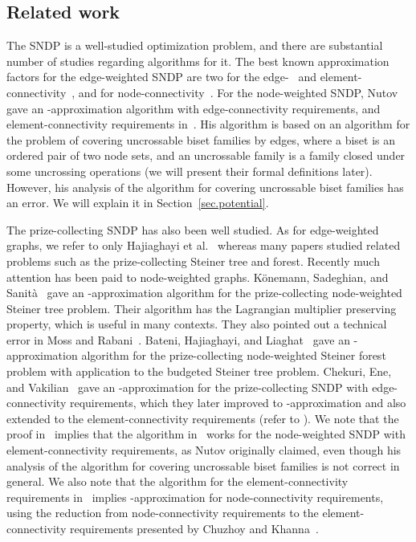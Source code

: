 \documentclass[11pt]{article}
\begin{document}
\subsection{Related work} 

The SNDP is a well-studied optimization
problem, and there are substantial number of studies regarding algorithms for
it. The best known approximation factors for the edge-weighted SNDP are two
for the edge-~\cite{Jain01} and element-connectivity~\cite{FleischerJW06},
and  for node-connectivity~\cite{ChuzhoyK12}. 
For the node-weighted SNDP, 
Nutov~\cite {Nutov10node-weights} gave an -approximation algorithm with edge-connectivity requirements, and
element-connectivity requirements in~\cite{Nutov12uncrossable}. His algorithm
is based on an algorithm for the problem of covering uncrossable biset
families by edges, where a biset is an ordered pair of two node sets, and an uncrossable family 
is a family closed under some uncrossing operations (we will present their formal definitions later). 
However, his analysis of the
algorithm for covering uncrossable biset families has an error.
We will explain it in Section~\ref{sec.potential}.

The prize-collecting SNDP has also been well studied.
As for edge-weighted graphs,
we refer to only Hajiaghayi et al.~\cite{HajiaghayiKKN12} 
whereas many papers studied related problems such as the prize-collecting Steiner tree and forest.
Recently much attention has been paid to node-weighted graphs.
K\"onemann, Sadeghian, and Sanit\`a~\cite{Konemann13CoRR} gave an -approximation algorithm for the prize-collecting node-weighted Steiner tree problem.
Their algorithm has the Lagrangian multiplier preserving property, which is
useful in many contexts.
They also pointed out a technical error in Moss and Rabani~\cite{MossR07}.
Bateni, Hajiaghayi, and Liaghat~\cite{BateniHL13} gave an -approximation algorithm for the prize-collecting node-weighted Steiner forest
problem with application to the budgeted Steiner tree problem.
Chekuri, Ene, and Vakilian~\cite{ChekuriEV12} gave an -approximation for the prize-collecting SNDP with edge-connectivity
requirements, which they later improved to -approximation
and also extended to 
the element-connectivity
requirements (refer to \cite{Vakilian13}).
We note that the proof in~\cite{Vakilian13} implies that the 
algorithm in~\cite{Nutov12uncrossable} works for the node-weighted SNDP
with element-connectivity requirements,
as Nutov originally claimed, even though his analysis of the algorithm for covering
uncrossable biset families is not correct in general.
We also note that 
the algorithm for the element-connectivity requirements in~\cite{Vakilian13} implies 
-approximation for node-connectivity requirements,
using the reduction from node-connectivity requirements to 
the element-connectivity requirements presented by Chuzhoy and Khanna~\cite{ChuzhoyK12}.
\end{document}
